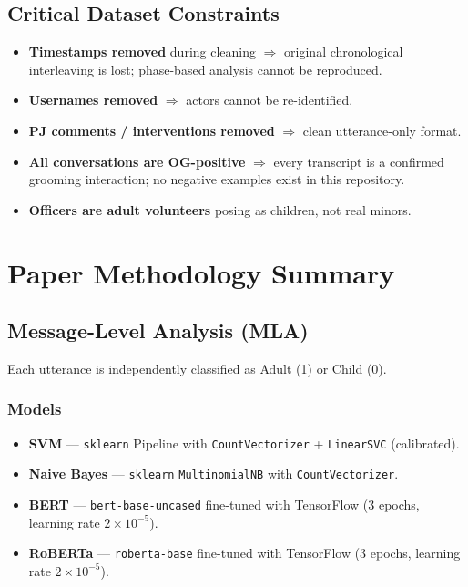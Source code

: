\documentclass[12pt,a4paper]{article}
\begin{document}
\subsection{Critical Dataset Constraints}

\begin{itemize}[leftmargin=*]
  \item \textbf{Timestamps removed} during cleaning $\Rightarrow$ original
        chronological interleaving is lost; phase-based analysis cannot be
        reproduced.
  \item \textbf{Usernames removed} $\Rightarrow$ actors cannot be
        re-identified.
  \item \textbf{PJ comments / interventions removed} $\Rightarrow$ clean
        utterance-only format.
  \item \textbf{All conversations are OG-positive} $\Rightarrow$ every
        transcript is a confirmed grooming interaction; no negative examples
        exist in this repository.
  \item \textbf{Officers are adult volunteers} posing as children, not real
        minors.
\end{itemize}

\section{Paper Methodology Summary}

\subsection{Message-Level Analysis (MLA)}

Each utterance is independently classified as Adult (1) or Child (0).

\subsubsection{Models}

\begin{itemize}[leftmargin=*]
  \item \textbf{SVM} --- \texttt{sklearn} Pipeline with
        \texttt{CountVectorizer} + \texttt{LinearSVC} (calibrated).
  \item \textbf{Naive Bayes} --- \texttt{sklearn} \texttt{MultinomialNB}
        with \texttt{CountVectorizer}.
  \item \textbf{BERT} --- \texttt{bert-base-uncased} fine-tuned with
        TensorFlow (3 epochs, learning rate $2 \times 10^{-5}$).
  \item \textbf{RoBERTa} --- \texttt{roberta-base} fine-tuned with
        TensorFlow (3 epochs, learning rate $2 \times 10^{-5}$).
\end{itemize}
\end{document}
